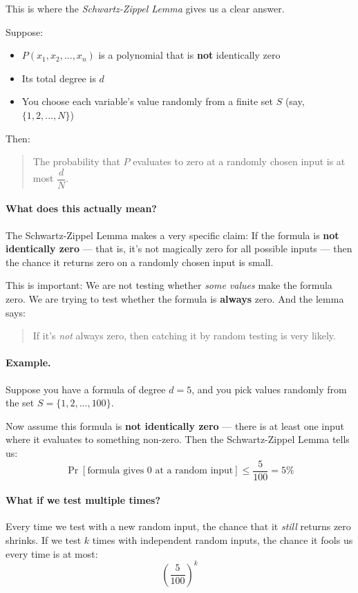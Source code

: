 This is where the \textit{Schwartz-Zippel Lemma} gives us a clear answer.

Suppose:
\begin{itemize}
  \item $P(x_1, x_2, ..., x_n)$ is a polynomial that is \textbf{not} identically zero
  \item Its total degree is $d$
  \item You choose each variable’s value randomly from a finite set $S$ (say, $\{1, 2, ..., N\}$)
\end{itemize}

Then:
\begin{quote}
The probability that $P$ evaluates to zero at a randomly chosen input is at most $\dfrac{d}{N}$.
\end{quote}

\paragraph{What does this actually mean?}

The Schwartz-Zippel Lemma makes a very specific claim:  
If the formula is \textbf{not identically zero} — that is, it's not magically zero for all possible inputs — then the chance it returns zero on a randomly chosen input is small.

This is important:  
We are not testing whether \textit{some values} make the formula zero. We are trying to test whether the formula is \textbf{always} zero. And the lemma says:  
\begin{quote}
If it's \textit{not} always zero, then catching it by random testing is very likely.
\end{quote}

\paragraph{Example.}  
Suppose you have a formula of degree $d = 5$, and you pick values randomly from the set $S = \{1, 2, ..., 100\}$.

Now assume this formula is \textbf{not identically zero} — there is at least one input where it evaluates to something non-zero.  
Then the Schwartz-Zippel Lemma tells us:
\[
\Pr[\text{formula gives 0 at a random input}] \leq \frac{5}{100} = 5\%
\]

\paragraph{What if we test multiple times?}  
Every time we test with a new random input, the chance that it \textit{still} returns zero shrinks. If we test $k$ times with independent random inputs, the chance it fools us every time is at most:
\[
\left(\frac{5}{100}\right)^k
\]

